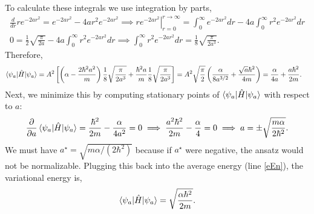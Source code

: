 \documentclass[10pt]{article}
\newcommand{\1}{\mathbf 1}
\begin{document}
To calculate these integrals we use integration by parts,
\begin{gather}
	\frac{d}{dr} r e^{-2ar^2}
	=
	e^{-2ar^2}
	-
	4a r^2 e^{-2ar^2}
	\implies
	\left. r e^{-2ar^2}\right|_{r=0}^{r \to \infty}
	=
	\int_0^\infty e^{-2ar^2} dr
	-
	4a 
	\int_0^\infty r^2 e^{-2ar^2} dr
	\nonumber
	\\
	0
	=
	\frac{1}{2}\sqrt{\frac{\pi}{2a}}
	-
	4a \int_0^\infty r^2 e^{-2ar^2} dr
	\implies
	\int_0^\infty r^2 e^{-2ar^2}dr
	=
	\frac{1}{8}
	\sqrt{\frac{\pi}{2a^3}}.
\end{gather}
Therefore,
\begin{align}
	\braket{\psi_a | \hat H | \psi_a}
	&=
	A^2 
	\left[
	\left(
		\alpha-\frac{2\hbar^2a^2}{m} 
	\right)
	\frac{1}{8} \sqrt{\frac{\pi}{2a^3}}
	+
	\frac{\hbar^2 a}{m}
	\frac{1}{8}\sqrt{\frac{\pi}{2a^3}}
	\right]
	=
	A^2 \sqrt{\frac{\pi}{2}}
	\left(
		\frac{\alpha }{8 a^{3/2}}+\frac{\sqrt{a} \hbar ^2}{4 m}
	\right)
	=
	\frac{\alpha }{4 a}+\frac{a \hbar ^2}{2 m}.
	\label{eEn}
\end{align}
Next, we minimize this by computing stationary points of $\braket{\psi_a | \hat H | \psi_a}$ with respect to $a$:
\begin{align}
	\frac{\partial}{\partial a}\braket{\psi_a | \hat H | \psi_a}
	=
	\frac{\hbar ^2}{2 m}-\frac{\alpha }{4 a^2}
	=
	0
	\implies
	\frac{a^2 \hbar ^2}{2 m}-\frac{\alpha }{4}
	=
	0
	\implies
	a 
	=
	\pm
	\sqrt{\frac{m\alpha}{2\hbar^2}}.
\end{align}
We must have $a^\star = \sqrt{m\alpha/(2\hbar^2)}$ because if $a^\star$ were negative, the ansatz would not be normalizable.
Plugging this back into the average energy (line \ref{eEn}), the variational energy is,
\begin{align}
	\braket{\psi_a | \hat H | \psi_a}
	=\sqrt{\frac{\alpha\hbar^2}{2m}}.
\end{align}
\end{document}
